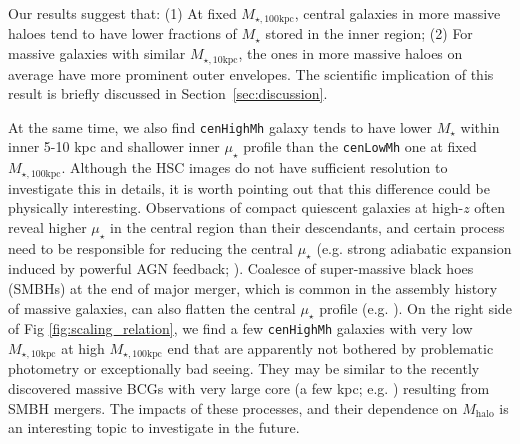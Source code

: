 \documentclass[a4paper,fleqn,usenatbib]{mnras}
\def\rbcg{\texttt{cenHighMh}}
\def\nbcg{\texttt{cenLowMh}}
\def\mstar{{$M_{\star}$}}
\def\mhalo{{$M_{\mathrm{halo}}$}}
\def\minn{{$M_{\star,10\mathrm{kpc}}$}}
\def\mtot{{$M_{\star,100\mathrm{kpc}}$}}
\def\mden{{$\mu_{\star}$}}
\begin{document}
    Our results suggest that: 
    (1) At fixed \mtot{}, central galaxies in more massive haloes tend to have 
    lower fractions of \mstar{} stored in the inner region; 
    (2) For massive galaxies with similar \minn{}, the ones in more massive haloes on 
    average have more prominent outer envelopes. 
    The scientific implication of this result is briefly discussed in 
    Section~\ref{sec:discussion}.

    At the same time, we also find \rbcg{} galaxy tends to have lower \mstar{} within 
    inner 5-10 kpc and shallower inner \mden{} profile than the \nbcg{} one at 
    fixed \mtot{}. 
    Although the HSC images do not have sufficient resolution to investigate this in 
    details, it is worth pointing out that this difference could be physically 
    interesting. 
    Observations of compact quiescent galaxies at high-$z$ often reveal higher 
    \mden{} in the central region than their descendants, and certain process need to  
    be responsible for reducing the central \mden{} (e.g. strong adiabatic expansion 
    induced by powerful AGN feedback; \citealt{Fan2008}).
    Coalesce of super-massive black hoes (SMBHs) at the end of major merger, which is 
    common in the assembly history of massive galaxies, can also flatten the central 
    \mden{} profile (e.g. \citealt{Milosavljevi2002}).
    On the right side of Fig \ref{fig:scaling_relation}, we find a few \rbcg{} galaxies 
    with very low \minn{} at high \mtot{} end that are apparently not bothered by 
    problematic photometry or exceptionally bad seeing.  
    They may be similar to the recently discovered massive BCGs with very large core 
    (a few kpc; e.g. \citealt{Postman2012, LopezCruz2014}) resulting from SMBH mergers.
    The impacts of these processes, and their dependence on \mhalo{} is an interesting 
    topic to investigate in the future.
\end{document}
